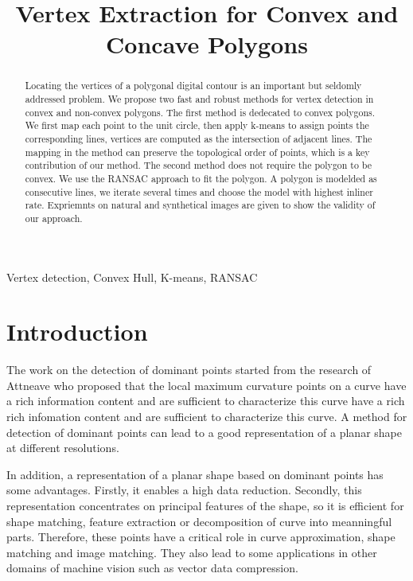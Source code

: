 \documentclass{article}
\title{Vertex Extraction for Convex and Concave Polygons}
\begin{document}
%
\maketitle
%
\begin{abstract}

Locating the vertices of a polygonal digital contour is an important but seldomly addressed problem.
We propose two fast and robust methods for vertex detection in convex and non-convex polygons.
The first method is dedecated to convex polygons. We first map each point to the unit circle, then apply
k-means to assign points the corresponding lines, vertices are computed as the intersection of adjacent lines.
The mapping in the method can preserve the topological order of points, which is a key contribution of our method.
The second method does not require the polygon to be convex. We use the RANSAC approach to fit the polygon. A polygon
is modelded as consecutive lines, we iterate several times and choose the model with highest inliner rate. Expriemnts
on natural and synthetical images are given to show the validity of our approach.

\end{abstract}
%
\begin{keywords}
  Vertex detection, Convex Hull, K-means, RANSAC
\end{keywords}
%
\section{Introduction}
\label{sec:intro}
The work on the detection of dominant points started from the research of Attneave who proposed that the local maximum
curvature points on a curve have a rich information content and are sufficient to characterize this curve have a rich
rich infomation content and are sufficient to characterize this curve. A method for detection of
dominant points can lead to a good representation of a planar shape at different resolutions.

In addition, a representation of a planar shape based on dominant points has some advantages.
Firstly, it enables a high data reduction.
Secondly, this representation concentrates on principal features of the shape, so it is
efficient for shape matching, feature extraction or decomposition of curve into meanningful parts.
Therefore, these points have a critical role in curve approximation, shape matching and image matching.
They also lead to some applications in other domains of machine vision such as vector data compression.
\end{document}
